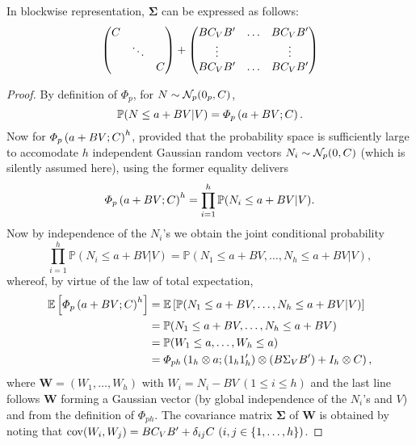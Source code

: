 \begin{remark}
In blockwise representation, $\bm{\Sigma}$ can be expressed as follows:
\begin{align*}
\begin{pmatrix}
    \covN & &\\
        & \ddots &\\
        &   & \covN
\end{pmatrix}
+
\begin{pmatrix}
B\covV B' & \dots & B\covV  B'\\
\vdots & & \vdots\\
B\covV B' & \dots & B\covV B'\\
\end{pmatrix}
\end{align*}
\end{remark}

\begin{proof}
By definition of $\Phi_{p}$, for $N\sim \mathcal{N}_{p}(0_{p},C)$,
$$
\mathbb{P}(N\leq a + BV | V)
=
\varPhi_{p}\left( a + BV; C \right).
$$
Now for $\varPhi_{p}\left( a + BV; C \right)^h$, provided that the probability space is sufficiently large to accomodate $h$ independent Gaussian random vectors $N_i\sim \mathcal{N}_{p}(0,C)$ (which is silently assumed here), using the former equality delivers
$$
\varPhi_{p}\left( a + BV; C \right)^h
=
\prod_{i=1}^h \mathbb{P}(N_i\leq a + BV | V).
$$
Now by independence of the $N_i$'s we obtain the joint conditional probability
$$
\prod_{i=1}^h \mathbb{P}(N_i\leq a + BV | V)
=
\mathbb{P}(N_1\leq a + BV, \dots, N_h\leq a + BV| V),
$$
whereof, by virtue of the law of total expectation,
\begin{equation*}
\begin{split}
\mathbb{E}\left[ \varPhi_{p}\left( a + BV; \covN \right)^h \right]
&=\mathbb{E}\left[\mathbb{P}(N_1\leq a + BV, \dots, N_h\leq a + BV| V)\right]\\
&=\mathbb{P}(N_1\leq a + BV, \dots, N_h\leq a + BV)\\
&=\mathbb{P}(W_1 \leq a, \dots, W_h\leq a)\\
&=\varPhi_{ph}
\left(
1_{h} \otimes a
;
(1_{h}1_{h}')\otimes (B\Sigma_{V} B') + 
I_{h}\otimes \covN
\right),
\end{split}
\end{equation*}
where $\mathbf{W}=(W_1,\dots,W_h)$ with $W_i=N_i- BV \ (1\leq i \leq h)$
and the last line follows $\mathbf{W}$ forming a Gaussian vector (by global independence of the $N_i$'s and $V$) and from the definition of $\varPhi_{p h}$. The covariance matrix $\mathbf{\Sigma}$ of $\mathbf{W}$ is obtained by noting that $\operatorname{cov}(W_i,W_j)=B \covV B' + \delta_{ij} \covN \ 
(i,j \in \{1,\dots,h\})$.
\end{proof}


